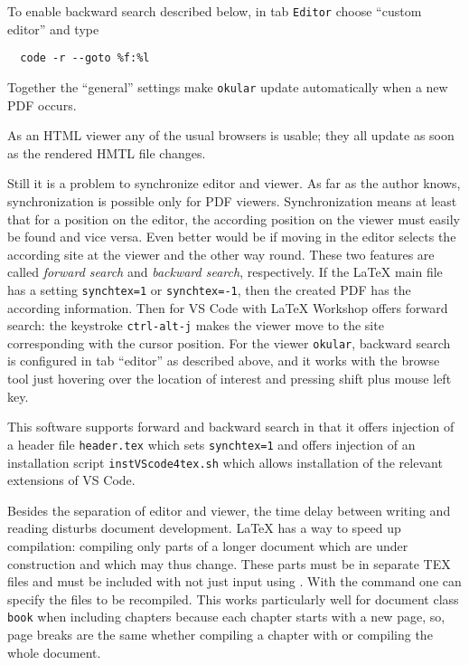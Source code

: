 To enable backward search described below, 
in tab \texttt{Editor} choose ``custom editor'' and type 
%
\begin{Verbatim}
  code -r --goto %f:%l
\end{Verbatim}

Together the ``general'' settings make \texttt{okular} update automatically 
when a new PDF occurs. 

As an HTML viewer any of the usual browsers is usable; 
they all update as soon as the rendered HMTL file changes. 

Still it is a problem to synchronize editor and viewer. 
As far as the author knows, synchronization is possible only for PDF viewers. 
Synchronization means at least that for a position on the editor, 
the according position on the viewer must easily be found 
and vice versa. 
Even better would be if moving in the editor selects the according site at the viewer 
and the other way round. 
These two features are called \emph{forward search} and \emph{backward search}, respectively. 
If the \LaTeX{} main file has a setting \texttt{synchtex=1} or \texttt{synchtex=-1}, 
then the created PDF has the according information. 
Then for VS Code with \LaTeX{} Workshop offers forward search: 
the keystroke \texttt{ctrl-alt-j} 
makes the viewer move to the site corresponding with the cursor position. 
For the viewer \texttt{okular}, backward search is configured in tab ``editor'' 
as described above, 
and it works with the browse tool just hovering over the location of interest 
and pressing shift plus mouse left key. 

This software supports forward and backward search 
in that it offers injection of a header file \texttt{header.tex} 
which sets \texttt{synchtex=1} 
and offers injection of an installation script \texttt{instVScode4tex.sh} 
which allows installation of the relevant extensions of VS Code. 
\medskip


Besides the separation of editor and viewer, 
the time delay between writing and reading 
disturbs document development. 
\LaTeX{} has a way to speed up compilation: 
compiling only parts of a longer document 
which are under construction and which may thus change. 
These parts must be in separate TEX files 
and must be included with  
not just input using . 
With the command  
one can specify the files to be recompiled. 
This works particularly well for document class \texttt{book} 
when including chapters because each chapter starts with a new page, 
so, page breaks are the same whether 
compiling a chapter with  
or compiling the whole document. 


